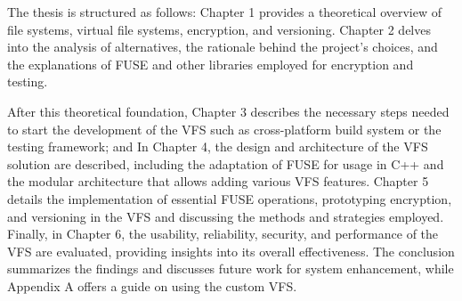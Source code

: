 The thesis is structured as follows: Chapter 1 provides a theoretical overview of file systems, virtual file systems, encryption, and versioning.
Chapter 2 delves into the analysis of alternatives, the rationale behind the project's choices, and the explanations of FUSE and other libraries employed for encryption and testing.

After this theoretical foundation, Chapter 3 describes the necessary steps needed to start the development of the VFS such as cross-platform build system or the testing framework;
and In Chapter 4, the design and architecture of the VFS solution are described, including the adaptation of FUSE for usage in C++ and the modular architecture that allows adding various VFS features.
Chapter 5 details the implementation of essential FUSE operations, prototyping encryption, and versioning in the VFS and discussing the methods and strategies employed.
Finally, in Chapter 6, the usability, reliability, security, and performance of the VFS are evaluated, providing insights into its overall effectiveness.
The conclusion summarizes the findings and discusses future work for system enhancement, while Appendix A offers a guide on using the custom VFS.